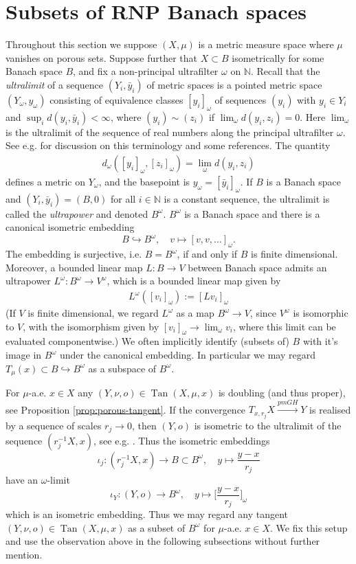 \documentclass{amsart}
\numberwithin{equation}{section}
\newcommand{\N}{\mathbb{N}}
\newcommand{\inv}{^{-1}}
\newcommand{\Tan}{\operatorname{Tan}}
\begin{document}
\section{Subsets of RNP Banach spaces}\label{sec:RNP}


Throughout this section we suppose $(X,\mu)$ is a metric measure space where $\mu$ vanishes on porous sets. Suppose further that $X\subset B$ isometrically for some Banach space $B$, and fix a non-principal ultrafilter $\omega$ on $\N$. Recall that the \emph{ultralimit} of a sequence $(Y_i,\bar y_i)$ of metric spaces is a pointed metric space $(Y_\omega,y_\omega)$ consisting of equivalence classes $[y_i]_\omega$ of sequences $(y_i)$ with $y_i\in Y_i$ and $\sup_id(y_i,\bar y_i)<\infty$, where $(y_i)\sim(z_i)$ if $\lim_\omega d(y_i,z_i)=0$. Here $\lim_\omega$ is the ultralimit of the sequence of real numbers along the principal ultrafilter $\omega$. See e.g. \cite{pasqualettoschultz} for discussion on this terminology and some references. The quantity
\begin{align*}
    d_\omega([y_i]_\omega,[z_i]_\omega)=\lim_\omega d(y_i,z_i)
\end{align*}
defines a metric on $Y_\omega$, and the basepoint is $y_\omega=[\bar y_i]_\omega$. If $B$ is a Banach space and $(Y_i,\bar y_i)=(B,0)$ for all $i\in\N$ is a constant sequence, the ultralimit is called the \emph{ultrapower} and denoted $B^\omega$. $B^\omega$ is a Banach space and there is a canonical isometric  embedding 
\[
B\hookrightarrow B^\omega,\quad v\mapsto [v,v,\ldots]_\omega.
\]
The embedding is surjective, i.e. $B=B^\omega$, if and only if $B$ is finite dimensional. Moreover, a bounded linear map $L:B\to V$ between Banach space admits an ultrapower $L^\omega:B^\omega\to V^\omega$, which is a bounded linear map given by 
\begin{align*}
L^\omega([v_i]_\omega):=[L v_i]_\omega    
\end{align*}
(If $V$ is finite dimensional, we regard $L^\omega$ as a map $B^\omega\to V$, since $V^\omega$ is isomorphic to $V$, with the isomorphism given by $[v_i]_\omega \to \lim_\omega v_i$, where this limit can be evaluated componentwise.) We often implicitly identify (subsets of) $B$ with it's image in $B^\omega$ under the canonical embedding. In particular we may regard $T_\mu(x)\subset B\hookrightarrow B^\omega$ as a subspace of $B^\omega$.

For $\mu$-a.e. $x\in X$ any $(Y,\nu,o)\in \Tan(X,\mu,x)$ is doubling (and thus proper), see Proposition \ref{prop:porous-tangent}. If the convergence $T_{x,r_j}X\stackrel{pmGH}{\longrightarrow}Y$ is realised by a sequence of scales $r_j\to 0$, then $(Y,o)$ is isometric to the ultralimit of the sequence $(r_j\inv X,x)$, see e.g. \cite[Corollary 9.3]{pasqualettoschultz}. Thus the isometric embeddings
\[
\iota_j:(r_j\inv X,x)\to B\subset B^\omega,\quad y\mapsto \frac{y-x}{r_j}
\]
have an $\omega$-limit 
\[
\iota_Y:(Y,o)\to B^\omega,\quad y\mapsto \Big[\frac{y-x}{r_j}\Big]_\omega
\]
which is an isometric embedding. Thus we may regard any tangent $(Y,\nu,o)\in\Tan(X,\mu,x)$ as a subset of $B^\omega$ for $\mu$-a.e. $x\in X$. We fix this setup and use the observation above in the following subsections without further mention.
\end{document}
